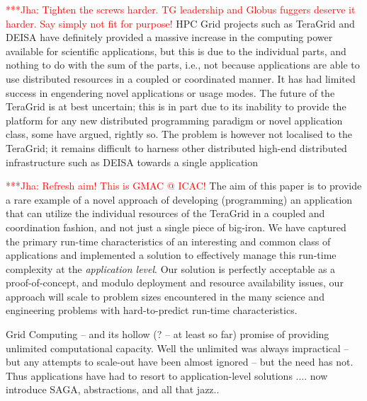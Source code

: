 \documentclass[conference,final]{IEEEtran}
\newcommand{\jhanote}[1]{ {\textcolor{red} { ***Jha: #1 }}}
\begin{document}

\jhanote{Tighten the screws harder. TG leadership and Globus fuggers
  deserve it harder. Say simply not fit for purpose!}  HPC Grid
projects such as TeraGrid and DEISA have definitely provided a massive
increase in the computing power available for scientific applications,
but this is due to the individual parts, and nothing to do with the
sum of the parts, i.e., not because applications are able to use
distributed resources in a coupled or coordinated manner.  It has had
limited success in engendering novel applications or usage modes.  The
future of the TeraGrid \cite{teragridfuture} is at best uncertain;
this is in part due to its inability to provide the platform for any
new distributed programming paradigm or novel application class, some
have argued, rightly so.  The problem is however not localised to the
TeraGrid; it remains difficult to harness other distributed high-end
distributed infrastructure such as DEISA towards a single application

\jhanote{Refresh aim! This is GMAC @ ICAC!}  The aim of this paper is
to provide a rare example of a novel approach of developing
(programming) an application that can utilize the individual resources
of the TeraGrid in a coupled and coordination fashion, and not just a
single piece of big-iron.  We have captured the primary run-time
characteristics of an interesting and common class of applications and
implemented a solution to effectively manage this run-time complexity
at the {\it application level}.  Our solution is perfectly acceptable
as a proof-of-concept, and modulo deployment and resource availability
issues, our approach will scale to problem sizes encountered in the
many science and engineering problems with hard-to-predict run-time
characteristics.

Grid Computing -- and its hollow (? -- at least so far) promise of
providing unlimited computational capacity. Well the unlimited was
always impractical -- but any attempts to scale-out have been almost
ignored -- but the need has not. Thus applications  have had to resort
to application-level solutions .... now introduce SAGA, abstractions,
and all that jazz..

\end{document}
